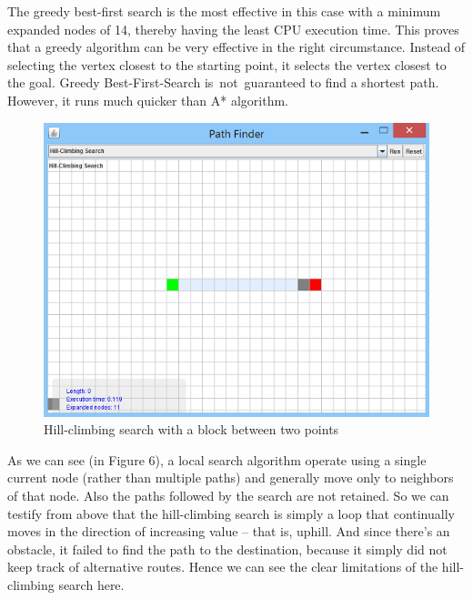 \documentclass[a4paper]{article}
\begin{document}
\noindent The greedy best-first search is the most effective in this case with a minimum expanded nodes of 14, thereby having the least CPU execution time. This proves that a greedy algorithm can be very effective in the right circumstance. Instead of selecting the vertex closest to the starting point, it selects the vertex closest to the goal. Greedy Best-First-Search is not guaranteed to find a shortest path. However, it runs much quicker than A* algorithm. \\

\begin{figure}[h!]
  \centering
    \includegraphics[scale=.9]{images/hillclimb1.png}
  \caption{Hill-climbing search with a block between two points}
\end{figure}

\noindent As we can see (in Figure 6), a local search algorithm operate using a single current node (rather than multiple paths) and generally move only to neighbors of that node. Also the paths followed by the search are not retained. So we can testify from above that the hill-climbing search is simply a loop that continually moves in the direction of increasing value – that is, uphill. And since there’s an obstacle, it failed to find the path to the destination, because it simply did not keep track of alternative routes. Hence we can see the clear limitations of the hill-climbing search here. \\
\end{document}

